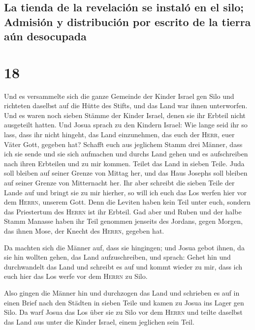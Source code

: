 \hypertarget{la-tienda-de-la-revelaciuxf3n-se-instaluxf3-en-el-silo-admisiuxf3n-y-distribuciuxf3n-por-escrito-de-la-tierra-auxfan-desocupada}{%
\subsection{La tienda de la revelación se instaló en el silo; Admisión y
distribución por escrito de la tierra aún
desocupada}\label{la-tienda-de-la-revelaciuxf3n-se-instaluxf3-en-el-silo-admisiuxf3n-y-distribuciuxf3n-por-escrito-de-la-tierra-auxfan-desocupada}}

\hypertarget{section-17}{%
\section{18}\label{section-17}}

 Und es versammelte sich die ganze Gemeinde der Kinder
Israel gen Silo und richteten daselbst auf die Hütte des Stifts, und das
Land war ihnen unterworfen.  Und es waren noch sieben
Stämme der Kinder Israel, denen sie ihr Erbteil nicht ausgeteilt hatten.
 Und Josua sprach zu den Kindern Israel: Wie lange seid
ihr so lass, dass ihr nicht hingeht, das Land einzunehmen, das euch der
\textsc{Herr}, euer Väter Gott, gegeben hat?  Schafft euch
aus jeglichem Stamm drei Männer, dass ich sie sende und sie sich
aufmachen und durchs Land gehen und es aufschreiben nach ihren Erbteilen
und zu mir kommen.  Teilet das Land in sieben Teile. Juda
soll bleiben auf seiner Grenze von Mittag her, und das Haus Josephs soll
bleiben auf seiner Grenze von Mitternacht her.  Ihr aber
schreibt die sieben Teile der Lande auf und bringt sie zu mir hierher,
so will ich euch das Los werfen hier vor dem \textsc{Herrn}, unserem
Gott.  Denn die Leviten haben kein Teil unter euch,
sondern das Priestertum des \textsc{Herrn} ist ihr Erbteil. Gad aber und
Ruben und der halbe Stamm Manasse haben ihr Teil genommen jenseits des
Jordans, gegen Morgen, das ihnen Mose, der Knecht des \textsc{Herrn},
gegeben hat.

 Da machten sich die Männer auf, dass sie hingingen; und
Josua gebot ihnen, da sie hin wollten gehen, das Land aufzuschreiben,
und sprach: Gehet hin und durchwandelt das Land und schreibt es auf und
kommt wieder zu mir, dass ich euch hier das Los werfe vor dem
\textsc{Herrn} zu Silo.

 Also gingen die Männer hin und durchzogen das Land und
schrieben es auf in einen Brief nach den Städten in sieben Teile und
kamen zu Josua ins Lager gen Silo.  Da warf Josua das Los
über sie zu Silo vor dem \textsc{Herrn} und teilte daselbst das Land aus
unter die Kinder Israel, einem jeglichen sein Teil.


